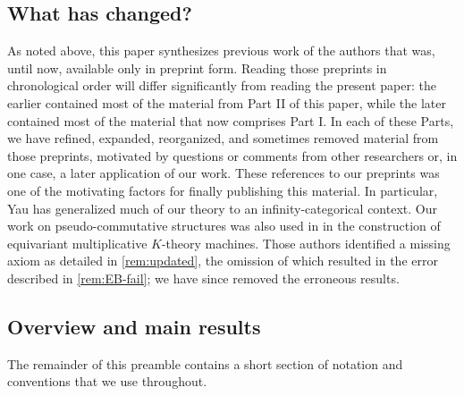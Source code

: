 \subsection*{What has changed?}

As noted above, this paper synthesizes previous work of the authors \cite{cg-preprint,g-borel} that was, until now, available only in preprint form.
Reading those preprints in chronological order will differ significantly from reading the present paper: the earlier \cite{cg-preprint} contained most of the material from Part II of this paper, while the later \cite{g-borel} contained most of the material that now comprises Part I.
In each of these Parts, we have refined, expanded, reorganized, and sometimes removed material from those preprints, motivated by questions or comments from other researchers or, in one case, a later application of our work.
These references to our preprints was one of the motivating factors for finally publishing this material.
In particular, Yau \cite{yau_infinity_2021} has generalized much of our theory to an infinity-categorical context.
Our work on pseudo-commutative structures was also used in \cite{guillou_symmetric,guillou_multiplicative} in the construction of equivariant multiplicative $K$-theory machines.
Those authors identified a missing axiom as detailed in \cref{rem:updated}, the omission of which resulted in the error described in \cref{rem:EB-fail}; we have since removed the erroneous results.

\subsection*{Overview and main results}

The remainder of this preamble contains a short section of notation and conventions that we use throughout.

